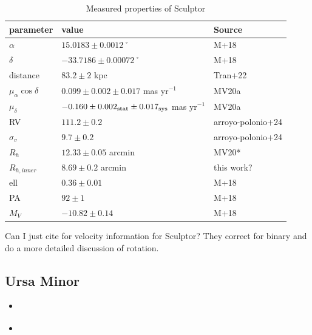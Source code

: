 \begin{table}[t]
\centering
\caption{Measured properties of Sculptor}
\label{tbl:Measured-properties-of-Sculptor}
\begin{tabular}{lll}
\toprule
parameter & value & Source\\
\midrule
$\alpha$ & $15.0183 \pm 0.0012$˚ & M+18\\
$\delta$ & $-33.7186 \pm 0.00072$˚ & M+18\\
distance & $83.2 \pm 2$ kpc & Tran+22\\
$\mu_\alpha \cos \delta$ & $0.099 \pm 0.002 \pm 0.017$ mas yr$^{-1}$ & MV20a\\
$\mu_\delta$ & $-0.160 \pm 0.002_{\rm stat} \pm 0.017_{\rm sys}$ mas yr$^{-1}$ & MV20a\\
RV & $111.2 \pm 0.2$ & arroyo-polonio+24\\
$\sigma_v$ & $9.7\pm0.2$ & arroyo-polonio+24\\
$R_h$ & $12.33 \pm 0.05$ arcmin & MV20*\\
$R_{h,inner}$ & $8.69 \pm 0.2$ arcmin & this work?\\
ell & $0.36 \pm 0.01$ & M+18\\
PA & $92\pm1$ & M+18\\
$M_V$ & $-10.82\pm0.14$ & M+18\\
\bottomrule
\end{tabular}
\end{table}

Can I just cite \citet{arroyo-polonio+2024} for velocity information for
Sculptor? They correct for binary and do a more detailed discussion of
rotation.

\subsection{Ursa Minor}\label{ursa-minor}

\begin{itemize}
\item
  \citet{sestito+2023b}
\item
  \citet{pace+2020}
\end{itemize}

